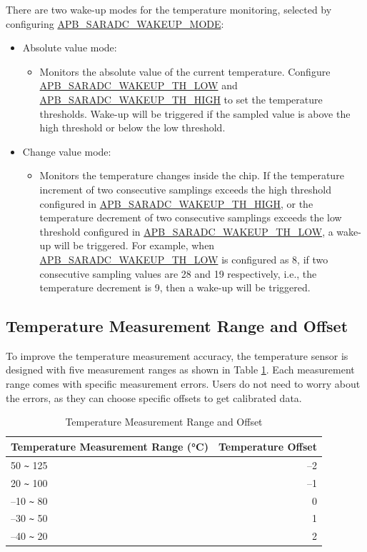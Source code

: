 \documentclass[main\_\_EN.tex]{subfiles}
\begin{document}
There are two wake-up modes for the temperature monitoring, selected by configuring \hyperref[fielddesc:APBSARADCWAKEUPMODE]{APB\_SARADC\_WAKEUP\_MODE}:

\begin{itemize}
    \item Absolute value mode:
        \begin{itemize}
            \item Monitors the absolute value of the current temperature. Configure \hyperref[fielddesc:APBSARADCWAKEUPTHLOW]{APB\_SARADC\_WAKEUP\_TH\_LOW} and \hyperref[fielddesc:APBSARADCWAKEUPTHHIGH]{APB\_SARADC\_WAKEUP\_TH\_HIGH} to set the temperature thresholds. Wake-up will be triggered if the sampled value is above the high threshold or below the low threshold.
        \end{itemize}
    \item Change value mode:
        \begin{itemize}
            \item Monitors the temperature changes inside the chip. If the temperature increment of two consecutive samplings exceeds the high threshold configured in \hyperref[fielddesc:APBSARADCWAKEUPTHHIGH]{APB\_SARADC\_WAKEUP\_TH\_HIGH}, or the temperature decrement of two consecutive samplings exceeds the low threshold configured in \hyperref[fielddesc:APBSARADCWAKEUPTHLOW]{APB\_SARADC\_WAKEUP\_TH\_LOW}, a wake-up will be triggered. For example, when \hyperref[fielddesc:APBSARADCWAKEUPTHLOW]{APB\_SARADC\_WAKEUP\_TH\_LOW} is configured as 8, if two consecutive sampling values are 28 and 19 respectively, i.e., the temperature decrement is 9, then a wake-up will be triggered.
        \end{itemize}
\end{itemize}

\subsection{Temperature Measurement Range and Offset}

To improve the temperature measurement accuracy, the temperature sensor is designed with five measurement ranges as shown in Table \ref{tab:tmpsen-dac}. Each measurement range comes with specific measurement errors. Users do not need to worry about the errors, as they can choose specific offsets to get calibrated data.

\begin{longtable}[c]{|l|r|}
    \caption{Temperature Measurement Range and Offset}
    \label{tab:tmpsen-dac}
    \\\hline
    \rowcolor{lightgray}
    Temperature Measurement Range (°C)   & Temperature Offset \\\hline
    50 \verb+~+ 125 &  –2 \\\hline
    20 \verb+~+ 100 &  –1 \\\hline
    –10 \verb+~+ 80 &  0 \\\hline
    –30 \verb+~+ 50 &  1 \\\hline
    –40 \verb+~+ 20 &  2 \\\hline
\end{longtable}
\end{document}
